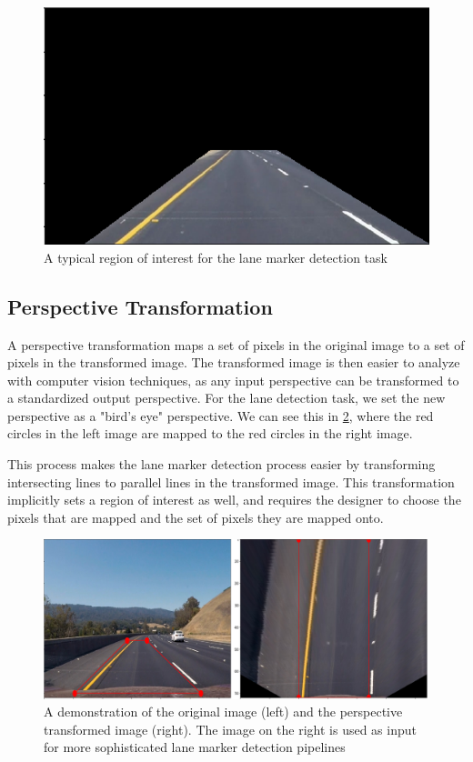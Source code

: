 \documentclass[conf]{new-aiaa}
\begin{document}
\begin{figure}[h!]
    \centering
    \includegraphics[scale = 0.75]{"./images/basic_region"}
    \caption{A typical region of interest for the lane marker detection task}
    \label{fig:basic_region}
\end{figure}

\subsection{Perspective Transformation}
A perspective transformation maps a set of pixels in the original image to a set of pixels in the transformed image.  The transformed image is then easier to analyze with computer vision techniques, as any input perspective can be transformed to a standardized output perspective.  For the lane detection task, we set the new perspective as a "bird's eye" perspective.
We can see this in \ref{fig:adv_perspective2}, where the red circles in the left image are mapped to the red circles in the right image.

This process makes the lane marker detection process easier by transforming intersecting lines to parallel lines in the transformed image.  This transformation implicitly sets a region of interest as well, and requires the designer to choose the pixels that are mapped and the set of pixels they are mapped onto.

\begin{figure}[h!]
    \centering
    \includegraphics[scale = 0.35]{"./images/adv_perspective2"}
    \caption{A demonstration of the original image (left) and the perspective transformed image (right).  The image on the right is used as input for more sophisticated lane marker detection pipelines}
    \label{fig:adv_perspective2}
\end{figure}
\end{document}
